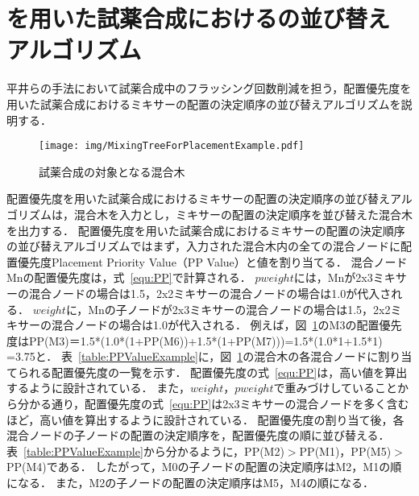 \section{を用いた試薬合成におけるの並び替えアルゴリズム}
平井らの手法において試薬合成中のフラッシング回数削減を担う，配置優先度を用いた試薬合成におけるミキサーの配置の決定順序の並び替えアルゴリズムを説明する．


\begin{figure}[tbp]
    \centering\texttt{[image: img/MixingTreeForPlacementExample.pdf]}
 \caption{試薬合成の対象となる混合木}\label{fig:placementTree}
\end{figure}

配置優先度を用いた試薬合成におけるミキサーの配置の決定順序の並び替えアルゴリズムは，混合木を入力とし，ミキサーの配置の決定順序を並び替えた混合木を出力する．
配置優先度を用いた試薬合成におけるミキサーの配置の決定順序の並び替えアルゴリズムではまず，入力された混合木内の全ての混合ノードに配置優先度Placement Priority Value（PP Value）と値を割り当てる．
混合ノードMnの配置優先度は，式~\eqref{equ:PP}で計算される．
$pweight$には，Mnが2x3ミキサーの混合ノードの場合は1.5，2x2ミキサーの混合ノードの場合は1.0が代入される．
$weight$に，Mnの子ノードが2x3ミキサーの混合ノードの場合は1.5，2x2ミキサーの混合ノードの場合は1.0が代入される．
例えば，図~\ref{fig:placementTree}のM3の配置優先度はPP(M3)＝1.5*(1.0*(1+PP(M6))+1.5*(1+PP(M7)))=1.5*(1.0*1+1.5*1) =3.75と．
表~\ref{table:PPValueExample}に，図~\ref{fig:placementTree}の混合木の各混合ノードに割り当てられる配置優先度の一覧を示す．
配置優先度の式~\eqref{equ:PP}は，高い値を算出するように設計されている．
また，$weight，pweight$で重みづけしていることから分かる通り，配置優先度の式~\eqref{equ:PP}は2x3ミキサーの混合ノードを多く含むほど，高い値を算出するように設計されている．
配置優先度の割り当て後，各混合ノードの子ノードの配置の決定順序を，配置優先度の順に並び替える．
表~\ref{table:PPValueExample}から分かるように，PP(M2)$>$PP(M1)，PP(M5)$>$PP(M4)である．
したがって，M0の子ノードの配置の決定順序はM2，M1の順になる．
また，M2の子ノードの配置の決定順序はM5，M4の順になる．


